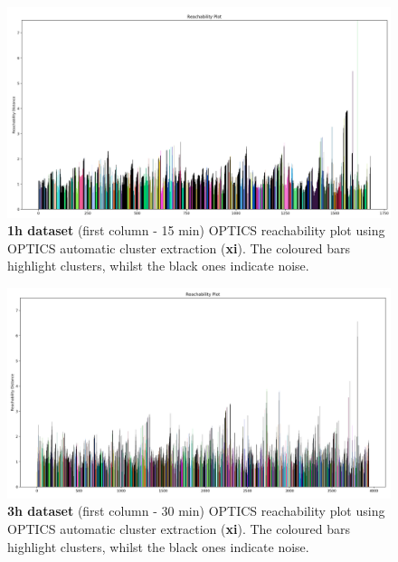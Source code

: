 \begin{figure}[H]
  \centering
  \includegraphics[width=1\textwidth]{./images/OPTICS/1h-1-reachabilityPlot-xi.png}
  \caption{\textbf{1h dataset} (first column - 15 min) OPTICS reachability plot using OPTICS automatic cluster extraction (\textbf{xi}). The coloured bars highlight clusters, whilst the black ones indicate noise.}
  \label{figure:fullSizeReachabilityPlotXi1h}
\end{figure}

\begin{figure}[H]
  \centering
  \includegraphics[width=1\textwidth]{./images/OPTICS/3h-1-reachabilityPlot-xi.png}
  \caption{\textbf{3h dataset} (first column - 30 min) OPTICS reachability plot using OPTICS automatic cluster extraction (\textbf{xi}). The coloured bars highlight clusters, whilst the black ones indicate noise.}
  \label{figure:fullSizeReachabilityPlotXi3h}
\end{figure}



